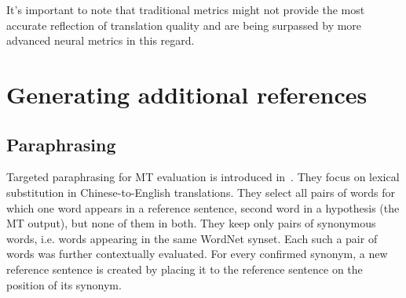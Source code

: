 It's important to note that traditional metrics might not provide the most accurate reflection of translation quality and are being surpassed by more advanced neural metrics in this regard.



\section{Generating additional references}
\subsection{Paraphrasing}
Targeted paraphrasing for MT evaluation is introduced in~\citet{kauchak}. They 
focus on lexical substitution in Chinese-to-English translations. 
They select all pairs of words for which one word appears in a reference sentence,
second word in a hypothesis (the MT output), but none of them in both. They keep 
only pairs of synonymous words, i.e. words appearing in the same WordNet 
\cite{wordnet} synset. Each such a pair of words was further contextually evaluated. 
For every confirmed synonym, a new reference sentence is created by placing it to the
reference sentence on the position of its synonym.


